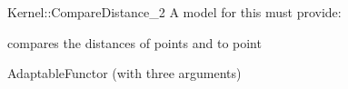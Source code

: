 \begin{ccRefFunctionObjectConcept}{Kernel::CompareDistance_2}
A model for this must provide:


      {compares the distances of points  and  to point }

\ccRefines
AdaptableFunctor (with three arguments)

\ccSeeAlso

 \\

\end{ccRefFunctionObjectConcept}
